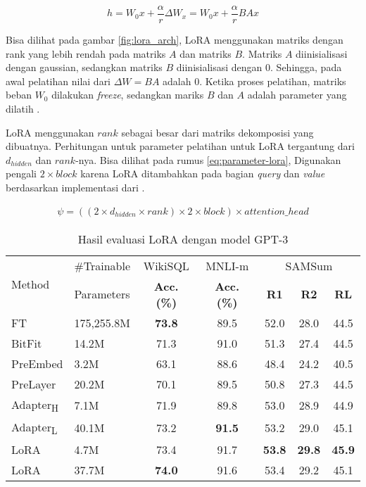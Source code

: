 \begin{equation}
    h = W_{0}x + \frac{\alpha}{r}\Delta{W_x} = W_{0}x + \frac{\alpha}{r}BAx
    \label{eq:lora-pass}
\end{equation}

Bisa dilihat pada gambar \ref{fig:lora_arch}, LoRA menggunakan matriks dengan rank yang lebih rendah pada matriks $A$ dan matriks $B$. Matriks $A$ diinisialisasi dengan gaussian, sedangkan matriks $B$ diinisialisasi dengan 0. Sehingga, pada awal pelatihan nilai dari $\Delta{W}=BA$ adalah 0. Ketika proses pelatihan, matriks beban $W_0$ dilakukan \textit{freeze}, sedangkan mariks $B$ dan $A$ adalah parameter yang dilatih \parencite{lora}.

LoRA menggunakan $rank$ sebagai besar dari matriks dekomposisi yang dibuatnya. Perhitungan untuk parameter pelatihan untuk LoRA tergantung dari $d_{hidden}$ dan $rank$-nya. Bisa dilihat pada rumus \ref{eq:parameter-lora}, Digunakan pengali $2 \times block$ karena LoRA ditambahkan pada bagian \textit{query} dan \textit{value} berdasarkan implementasi dari \citeauthor{adapters}.

\begin{equation}
    \begin{aligned}
        \psi = ((2 \times d_{hidden} \times rank) \times 2 \times block) \times attention\_head
    \end{aligned}
    \label{eq:parameter-lora}
\end{equation}

\begin{table}[ht]
    \vspace{0.25cm}
    \centering
    \caption{Hasil evaluasi LoRA dengan model GPT-3 \parencite{lora}}
    \label{table:lora_result}
    \begin{tabular}{l|l|ccccc}
        \toprule
        \multirow{2}{*}{Method} & \#Trainable & WikiSQL & MNLI-m & \multicolumn{3}{c}{SAMSum} \\
         & Parameters & \textbf{Acc. (\%)} & \textbf{Acc. (\%)} & \textbf{R1} & \textbf{R2} & \textbf{RL} \\
        \midrule
        FT & 175,255.8M & \textbf{73.8} & 89.5 & 52.0 & 28.0 & 44.5 \\
        BitFit & 14.2M & 71.3 & 91.0 & 51.3 & 27.4 & 44.5 \\
        PreEmbed & 3.2M & 63.1 & 88.6 & 48.4 & 24.2 & 40.5 \\
        PreLayer & 20.2M & 70.1 & 89.5 & 50.8 & 27.3 & 44.5 \\
        Adapter\textsubscript{H}  & 7.1M & 71.9 & 89.8 & 53.0 & 28.9 & 44.9 \\
        Adapter\textsubscript{L}  & 40.1M & 73.2 & \textbf{91.5} & 53.2 & 29.0 & 45.1 \\
        LoRA  & 4.7M & 73.4 & 91.7 & \textbf{53.8} & \textbf{29.8} & \textbf{45.9} \\
        LoRA  & 37.7M & \textbf{74.0} & 91.6 & 53.4 & 29.2 & 45.1 \\
        \bottomrule
    \end{tabular}
\end{table}

